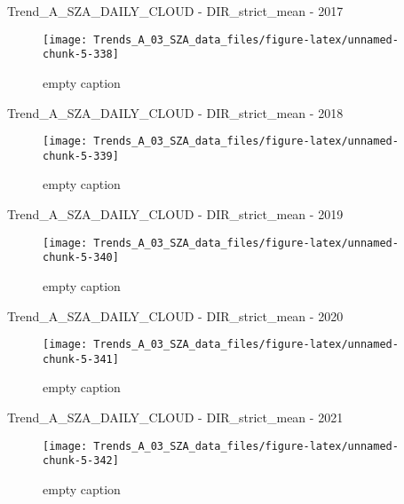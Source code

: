 \documentclass[
  10pt,
  a4paper,oneside]{article}
\begin{document}
Trend\_A\_SZA\_DAILY\_CLOUD - DIR\_strict\_mean - 2017

\begin{figure}[!ht]

{\centering \texttt{[image: Trends\_A\_03\_SZA\_data\_files/figure-latex/unnamed-chunk-5-338]} 

}

\caption{ empty caption }\label{fig:unnamed-chunk-5-338}
\end{figure}

Trend\_A\_SZA\_DAILY\_CLOUD - DIR\_strict\_mean - 2018

\begin{figure}[!ht]

{\centering \texttt{[image: Trends\_A\_03\_SZA\_data\_files/figure-latex/unnamed-chunk-5-339]} 

}

\caption{ empty caption }\label{fig:unnamed-chunk-5-339}
\end{figure}

Trend\_A\_SZA\_DAILY\_CLOUD - DIR\_strict\_mean - 2019

\begin{figure}[!ht]

{\centering \texttt{[image: Trends\_A\_03\_SZA\_data\_files/figure-latex/unnamed-chunk-5-340]} 

}

\caption{ empty caption }\label{fig:unnamed-chunk-5-340}
\end{figure}

Trend\_A\_SZA\_DAILY\_CLOUD - DIR\_strict\_mean - 2020

\begin{figure}[!ht]

{\centering \texttt{[image: Trends\_A\_03\_SZA\_data\_files/figure-latex/unnamed-chunk-5-341]} 

}

\caption{ empty caption }\label{fig:unnamed-chunk-5-341}
\end{figure}

Trend\_A\_SZA\_DAILY\_CLOUD - DIR\_strict\_mean - 2021

\begin{figure}[!ht]

{\centering \texttt{[image: Trends\_A\_03\_SZA\_data\_files/figure-latex/unnamed-chunk-5-342]} 

}

\caption{ empty caption }\label{fig:unnamed-chunk-5-342}
\end{figure}
\end{document}
